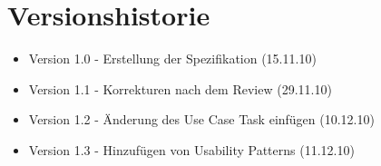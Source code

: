 \documentclass[a4paper,12pt]{scrartcl}
\begin{document}
\section{Versionshistorie} 
\begin{itemize}
\item Version 1.0 - Erstellung der Spezifikation (15.11.10)
\item Version 1.1 -	Korrekturen nach dem Review (29.11.10)
\item Version 1.2 - Änderung des Use Case Task einfügen (10.12.10)
\item Version 1.3 - Hinzufügen von Usability Patterns (11.12.10)
\end{itemize}
\end{document}

